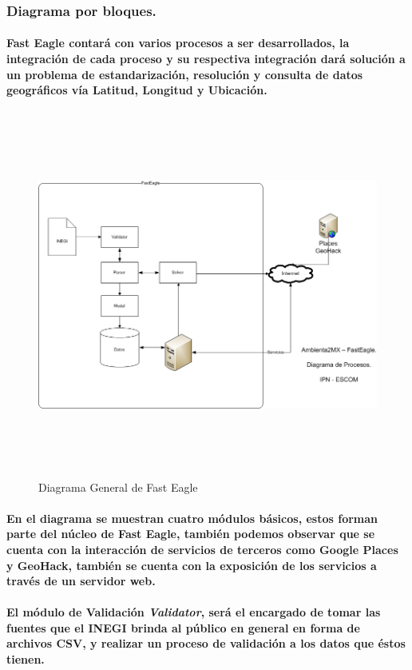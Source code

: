 	  \subsubsection{Diagrama por bloques.}
	  	\paragraph{Fast Eagle contará con varios procesos a ser desarrollados, la integración de cada proceso y su respectiva integración dará solución a un problema de estandarización, resolución y consulta de datos geográficos vía Latitud, Longitud y Ubicación.}
	  \newpage
	  	\begin{landscape}
		  	\begin{figure}[h!]
		  	\centering
			  \includegraphics[width=22.5cm,height=12cm]{./images/DiagramaFastEagle.png}
			  \caption{Diagrama General de Fast Eagle}
			\end{figure}
	  	\end{landscape}
	  \newpage
	  \paragraph{En el diagrama se muestran cuatro módulos básicos, estos forman parte del núcleo de Fast Eagle, también podemos observar que se cuenta con la interacción de servicios de terceros como Google Places y GeoHack, también se cuenta con la exposición de los servicios a través de un servidor  web.}
	  \paragraph{El módulo de Validación \textbf{\emph{Validator}}, será el encargado de tomar las fuentes que el INEGI brinda al público en general en forma de archivos CSV, y realizar un proceso de validación a los datos que éstos tienen.}
